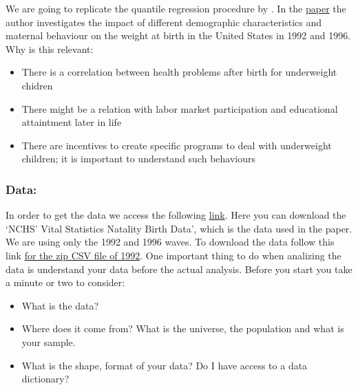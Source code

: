 \documentclass[]{book}
\providecommand{\tightlist}{%
  \setlength{\itemsep}{0pt}\setlength{\parskip}{0pt}}
\begin{document}
We are going to replicate the quantile regression procedure by
\citep{abrevaya2002effects}. In the
\href{https://link.springer.com/article/10.1007/s001810000052}{paper}
the author investigates the impact of different demographic
characteristics and maternal behaviour on the weight at birth in the
United States in 1992 and 1996. Why is this relevant:

\begin{itemize}
\tightlist
\item
  There is a correlation between health problems after birth for
  underweight chidren
\item
  There might be a relation with labor market participation and
  educational attaintment later in life
\item
  There are incentives to create specific programs to deal with
  underweight children; it is important to understand such behaviours
\end{itemize}

\subsubsection{Data:}\label{data}

In order to get the data we access the following
\href{https://www.nber.org/data/vital-statistics-natality-data.html}{link}.
Here you can download the `NCHS' Vital Statistics Natality Birth Data',
which is the data used in the paper. We are using only the 1992 and 1996
waves. To download the data follow this link
\href{https://www.nber.org/natality/1992/natl1992.csv.zip}{for the zip
CSV file of 1992}. One important thing to do when analizing the data is
understand your data before the actual analysis. Before you start you
take a minute or two to consider:

\begin{itemize}
\tightlist
\item
  What is the data?
\item
  Where does it come from? What is the universe, the population and what
  is your sample.
\item
  What is the shape, format of your data? Do I have access to a data
  dictionary?
\end{itemize}
\end{document}
